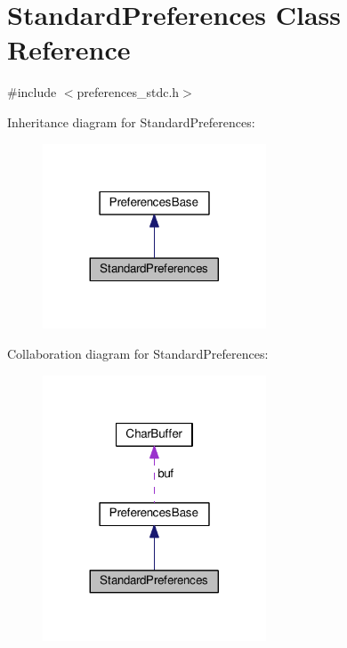 \hypertarget{classStandardPreferences}{}\section{Standard\+Preferences Class Reference}
\label{classStandardPreferences}


{\ttfamily \#include $<$preferences\+\_\+stdc.\+h$>$}



Inheritance diagram for Standard\+Preferences\+:
\nopagebreak
\begin{figure}[H]
\begin{center}
\leavevmode
\includegraphics[width=188pt]{d5/d84/classStandardPreferences__inherit__graph}
\end{center}
\end{figure}


Collaboration diagram for Standard\+Preferences\+:
\nopagebreak
\begin{figure}[H]
\begin{center}
\leavevmode
\includegraphics[width=188pt]{db/d0b/classStandardPreferences__coll__graph}
\end{center}
\end{figure}

